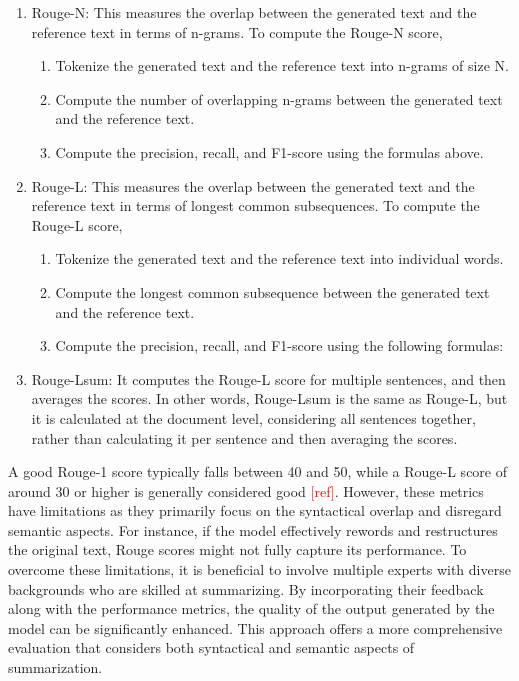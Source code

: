 \begin{enumerate}
\item Rouge-N: This measures the overlap between the generated text and the reference text in terms of n-grams. To compute the Rouge-N score,

	\begin{enumerate}[label=\roman*.]
	\item Tokenize the generated text and the reference text into n-grams of size N.
	\item Compute the number of overlapping n-grams between the generated text and the reference text.
	\item Compute the precision, recall, and F1-score using the formulas above. 
	\end{enumerate}


\item Rouge-L: This measures the overlap between the generated text and the reference text in terms of longest common subsequences. To compute the Rouge-L score,


	\begin{enumerate}[label=\roman*.]
	\item Tokenize the generated text and the reference text into individual words.
	\item Compute the longest common subsequence between the generated text and the reference text.
	\item Compute the precision, recall, and F1-score using the following formulas:
	\end{enumerate}


\item Rouge-Lsum: It computes the Rouge-L score for multiple sentences, and then averages the scores. In other words, Rouge-Lsum is the same as Rouge-L, but it is calculated at the document level, considering all sentences together, rather than calculating it per sentence and then averaging the scores.

\end{enumerate}

A good Rouge-1 score typically falls between 40 and 50, while a Rouge-L score of around 30 or higher is generally considered good \textcolor{red}{[ref]}. However, these metrics have limitations as they primarily focus on the syntactical overlap and disregard semantic aspects. For instance, if the model effectively rewords and restructures the original text, Rouge scores might not fully capture its performance. To overcome these limitations, it is beneficial to involve multiple experts with diverse backgrounds who are skilled at summarizing. By incorporating their feedback along with the performance metrics, the quality of the output generated by the model can be significantly enhanced. This approach offers a more comprehensive evaluation that considers both syntactical and semantic aspects of summarization.



